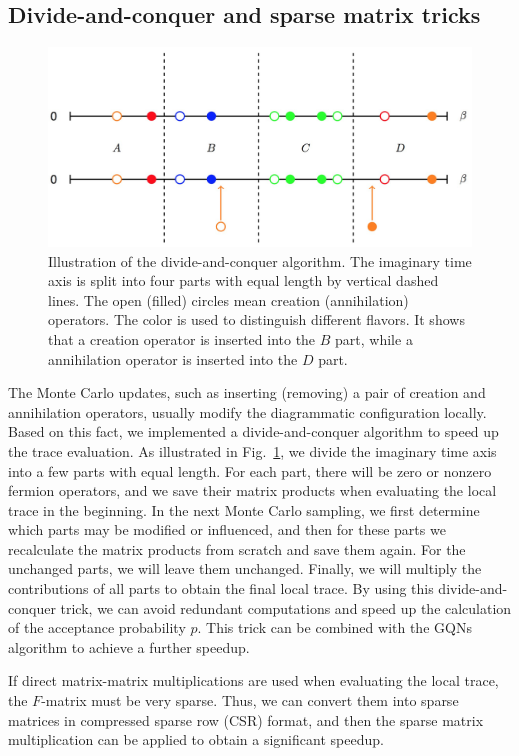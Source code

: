 \subsection{Divide-and-conquer and sparse matrix tricks}
\begin{figure}[tp]
\centering
\includegraphics[width=1.0\textwidth]{figure/divide.pdf}
\caption{Illustration of the divide-and-conquer algorithm. The imaginary time axis is split into four parts with equal length by vertical dashed lines. The open (filled) circles mean creation (annihilation) operators. The color is used to distinguish different flavors. It shows that a creation operator is inserted into the $B$ part, while a annihilation operator is inserted into the $D$ part. \label{fig:div}}
\end{figure}

The Monte Carlo updates, such as inserting (removing) a pair of creation and annihilation operators, usually modify the diagrammatic configuration locally. Based on this fact, we implemented a divide-and-conquer algorithm to speed up the trace evaluation. As illustrated in Fig.~\ref{fig:div}, we divide the imaginary time axis into a few parts with equal length. For each part, there will be zero or nonzero fermion operators, and we save their matrix products when evaluating the local trace in the beginning. In the next Monte Carlo sampling, we first determine which parts may be modified or influenced, and then for these parts we recalculate the matrix products from scratch and save them again. For the unchanged parts, we will leave them unchanged. Finally, we will multiply the contributions of all parts to obtain the final local trace. By using this divide-and-conquer trick, we can avoid redundant computations and speed up the calculation of the acceptance probability $p$. This trick can be combined with the GQNs algorithm to achieve a further speedup. 

If direct matrix-matrix multiplications are used when evaluating the local trace, the $F$-matrix must be very sparse. Thus, we can convert them into sparse matrices in compressed sparse row (CSR) format, and then the sparse matrix multiplication can be applied to obtain a significant speedup.

